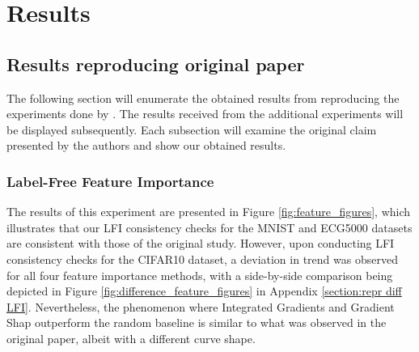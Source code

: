 
\section{Results}
\label{sec:results}

\subsection{Results reproducing original paper}
The following section will enumerate the obtained results from reproducing the experiments done by \citeauthor{LabelFreeExplainability}. The results received from the additional experiments will be displayed subsequently. Each subsection will examine the original claim presented by the authors and show our obtained results.

\subsubsection{Label-Free Feature Importance} 
The results of this experiment are presented in Figure \ref{fig:feature_figures}, which illustrates that our LFI consistency checks for the MNIST and ECG5000 datasets are consistent with those of the original study. However, upon conducting LFI consistency checks for the CIFAR10 dataset, a deviation in trend was observed for all four feature importance methods, with a side-by-side comparison being depicted in Figure \ref{fig:difference_feature_figures} in Appendix \ref{section:repr diff LFI}. Nevertheless, the phenomenon where Integrated Gradients and Gradient Shap outperform the random baseline is similar to what was observed in the original paper, albeit with a different curve shape. 

